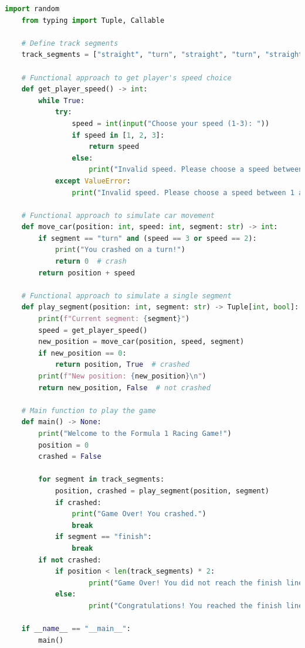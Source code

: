 \documentclass[12pt]{article}
\begin{document}
\begin{lstlisting}[language = Python]
    import random
    from typing import Tuple, Callable
    
    # Define track segments
    track_segments = ["straight", "turn", "straight", "turn", "straight", "finish"]
    
    # Functional approach to get player's speed choice
    def get_player_speed() -> int:
        while True:
            try:
                speed = int(input("Choose your speed (1-3): "))
                if speed in [1, 2, 3]:
                    return speed
                else:
                    print("Invalid speed. Please choose a speed between 1 and 3.")
            except ValueError:
                print("Invalid speed. Please choose a speed between 1 and 3.")
    
    # Functional approach to simulate car movement
    def move_car(position: int, speed: int, segment: str) -> int:
        if segment == "turn" and (speed == 3 or speed == 2):
            print("You crashed on a turn!")
            return 0  # crash
        return position + speed
    
    # Functional approach to simulate a single segment
    def play_segment(position: int, segment: str) -> Tuple[int, bool]:
        print(f"Current segment: {segment}")
        speed = get_player_speed()
        new_position = move_car(position, speed, segment)
        if new_position == 0:
            return position, True  # crashed
        print(f"New position: {new_position}\n")
        return new_position, False  # not crashed
    
    # Main function to play the game
    def main() -> None:
        print("Welcome to the Formula 1 Racing Game!")
        position = 0
        crashed = False
    
        for segment in track_segments:
            position, crashed = play_segment(position, segment)
            if crashed:
                print("Game Over! You crashed.")
                break
            if segment == "finish":
                break
        if not crashed:
            if position < len(track_segments) * 2:
                    print("Game Over! You did not reach the finish line in time.")
            else: 
                    print("Congratulations! You reached the finish line.")
    
    if __name__ == "__main__":
        main()
\end{lstlisting}
\end{document}
